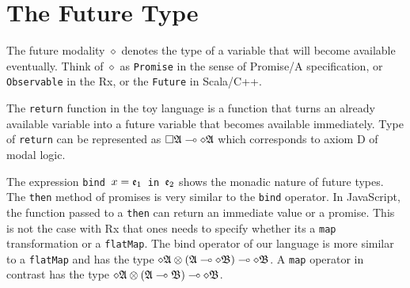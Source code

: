 \section{The Future Type}

The future modality $\diamond$ denotes the type of a variable that will become available eventually. Think of $\diamond$ as \texttt{Promise} in the sense of Promise/A specification, or \texttt{Observable} in the Rx, or the \texttt{Future} in Scala/C++.

The \texttt{return} function in the toy language is a function that turns an already available variable into a future variable that becomes available immediately. Type of \texttt{return} can be represented as $\square\mathfrak{A} \multimap \diamond\mathfrak{A}$ which corresponds to axiom D of modal logic.

The expression \texttt{bind}~$x = \mathfrak{e}_1$~\texttt{in}~$\mathfrak{e}_2$ shows the monadic nature of future types. The \texttt{then} method of promises is very similar to the \texttt{bind} operator. In JavaScript, the function passed to a \texttt{then} can return an immediate value or a promise. This is not the case with Rx that ones needs to specify whether its a \texttt{map} transformation or a \texttt{flatMap}. The bind operator of our language is more similar to a \texttt{flatMap} and has the type $\diamond\mathfrak{A} \otimes (\mathfrak{A} \multimap \diamond\mathfrak{B}) \multimap \diamond\mathfrak{B}$. A \texttt{map} operator in contrast has the type $\diamond\mathfrak{A} \otimes (\mathfrak{A} \multimap \mathfrak{B}) \multimap \diamond\mathfrak{B}$.